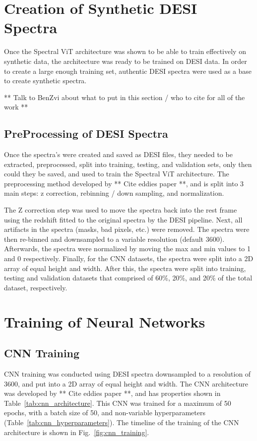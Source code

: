 \section{Creation of Synthetic DESI Spectra}
\label{sec:synth_data}
Once the Spectral ViT architecture was shown to be able to train effectively on synthetic data,
the architecture was ready to be trained on DESI data. In order to create a large enough training 
set, authentic DESI spectra were used as a base to create synthetic spectra.

** Talk to BenZvi about what to put in this section / who to cite for all of the work **

\subsection{PreProcessing of DESI Spectra}
\label{ssec:preprocess}
Once the spectra's were created and saved as DESI files, they needed to be 
extracted, preprocessed, split into training, testing, and validation sets, 
only then could they be saved, and used to train the Spectral ViT architecture.
The preprocessing method developed by ** Cite eddies paper **, and is split into 
3 main steps: z correction, rebinning / down sampling, and normalization. 

The Z correction step was used to move the spectra back into the rest frame using 
the redshift fitted to the original spectra by the DESI pipeline. Next, all artifacts 
in the spectra (masks, bad pixels, etc.) were removed. The spectra were then re-binned
and downsampled to a variable resolution (default 3600). Afterwards, the spectra were 
normalized by moving the max and min values to 1 and 0 respectively. Finally, for the 
CNN datasets, the spectra were split into a 2D array of equal height and width. 
After this, the spectra were split into training, testing and validation datasets that 
comprised of 60\%, 20\%, and 20\% of the total dataset, respectively.
\section{Training of Neural Networks}
\label{sec:training} 

\subsection{CNN Training}
\label{ssec:cnn_training}
CNN training was conducted using DESI spectra downsampled to a resolution of 3600, and 
put into a 2D array of equal height and width. The CNN architecture was developed 
by ** Cite eddies paper **, and has properties shown in Table~\ref{tab:cnn_architecture}.
This CNN was trained for a maximum of 50 epochs, with a batch size of 50, and 
non-variable hyperparameters (Table~\ref{tab:cnn_hyperparameters}). 
The timeline of the training of the CNN architecture is shown in Fig.~\ref{fig:cnn_training}.

